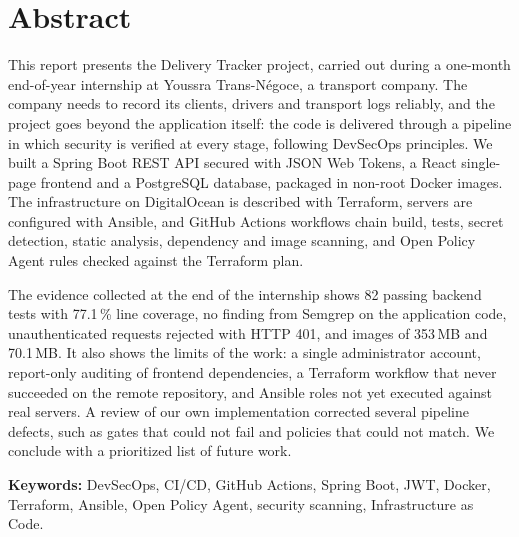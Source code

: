 \chapter*{Abstract}
This report presents the Delivery Tracker project, carried out during a one-month end-of-year internship at Youssra Trans-N\'egoce, a transport company. The company needs to record its clients, drivers and transport logs reliably, and the project goes beyond the application itself: the code is delivered through a pipeline in which security is verified at every stage, following DevSecOps principles. We built a Spring Boot REST API secured with JSON Web Tokens, a React single-page frontend and a PostgreSQL database, packaged in non-root Docker images. The infrastructure on DigitalOcean is described with Terraform, servers are configured with Ansible, and GitHub Actions workflows chain build, tests, secret detection, static analysis, dependency and image scanning, and Open Policy Agent rules checked against the Terraform plan.

The evidence collected at the end of the internship shows 82 passing backend tests with 77.1\,\% line coverage, no finding from Semgrep on the application code, unauthenticated requests rejected with HTTP 401, and images of 353\,MB and 70.1\,MB. It also shows the limits of the work: a single administrator account, report-only auditing of frontend dependencies, a Terraform workflow that never succeeded on the remote repository, and Ansible roles not yet executed against real servers. A review of our own implementation corrected several pipeline defects, such as gates that could not fail and policies that could not match. We conclude with a prioritized list of future work.

\textbf{Keywords:} DevSecOps, CI/CD, GitHub Actions, Spring Boot, JWT, Docker, Terraform, Ansible, Open Policy Agent, security scanning, Infrastructure as Code.
\clearpage

